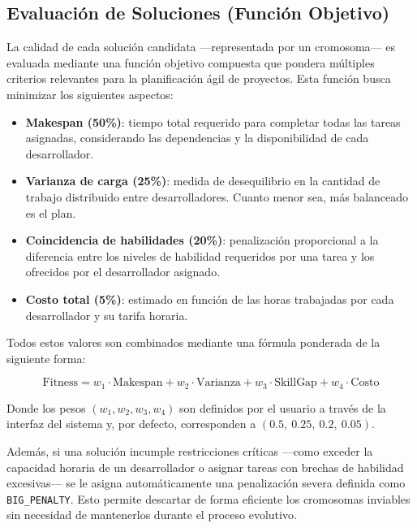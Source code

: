 
\subsection{Evaluación de Soluciones (Función Objetivo)}

La calidad de cada solución candidata —representada por un cromosoma— es evaluada mediante una función objetivo compuesta que pondera múltiples criterios relevantes para la planificación ágil de proyectos. Esta función busca minimizar los siguientes aspectos:

\begin{itemize}
    \item \textbf{Makespan (50\%)}: tiempo total requerido para completar todas las tareas asignadas, considerando las dependencias y la disponibilidad de cada desarrollador.
    \item \textbf{Varianza de carga (25\%)}: medida de desequilibrio en la cantidad de trabajo distribuido entre desarrolladores. Cuanto menor sea, más balanceado es el plan.
    \item \textbf{Coincidencia de habilidades (20\%)}: penalización proporcional a la diferencia entre los niveles de habilidad requeridos por una tarea y los ofrecidos por el desarrollador asignado.
    \item \textbf{Costo total (5\%)}: estimado en función de las horas trabajadas por cada desarrollador y su tarifa horaria.
\end{itemize}

Todos estos valores son combinados mediante una fórmula ponderada de la siguiente forma:

\[
    \text{Fitness} = w_1 \cdot \text{Makespan} + w_2 \cdot \text{Varianza} + w_3 \cdot \text{SkillGap} + w_4 \cdot \text{Costo}
\]

Donde los pesos $(w_1, w_2, w_3, w_4)$ son definidos por el usuario a través de la interfaz del sistema y, por defecto, corresponden a $(0.5,\ 0.25,\ 0.2,\ 0.05)$.

Además, si una solución incumple restricciones críticas —como exceder la capacidad horaria de un desarrollador o asignar tareas con brechas de habilidad excesivas— se le asigna automáticamente una penalización severa definida como \texttt{BIG\_PENALTY}. Esto permite descartar de forma eficiente los cromosomas inviables sin necesidad de mantenerlos durante el proceso evolutivo.

